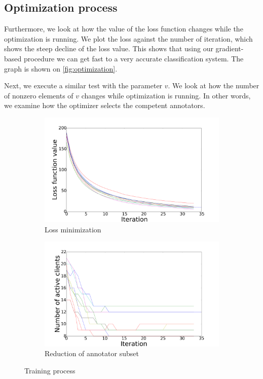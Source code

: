 \documentclass{llncs}
\begin{document}
\subsection{Optimization process}

Furthermore, we look at how the value of the loss function changes while the optimization is running. We plot the loss against the number of iteration, which shows the steep decline of the loss value. This shows that using our gradient-based procedure we can get fast to a very accurate classification system. The graph is shown on \autoref{fig:optimization}.

Next, we execute a similar test with the parameter $v$. We look at how the number of nonzero elements of $v$ changes while optimization is running. In other words, we examine how the optimizer selects the competent annotators.

\begin{figure}[!htb]	
    \centering
    
    \begin{subfigure}[b]{0.45\textwidth}
        \includegraphics[width=\textwidth]{figures/loss_iteration_logreg}
        \caption{Loss minimization}

    \end{subfigure}
    \begin{subfigure}[b]{0.45\textwidth}
        \includegraphics[width=\textwidth]{figures/v_iteration_logreg}
        \caption{Reduction of annotator subset}

    \end{subfigure}
    \caption{Training process}
    \label{fig:optimization}
\end{figure}
\end{document}
